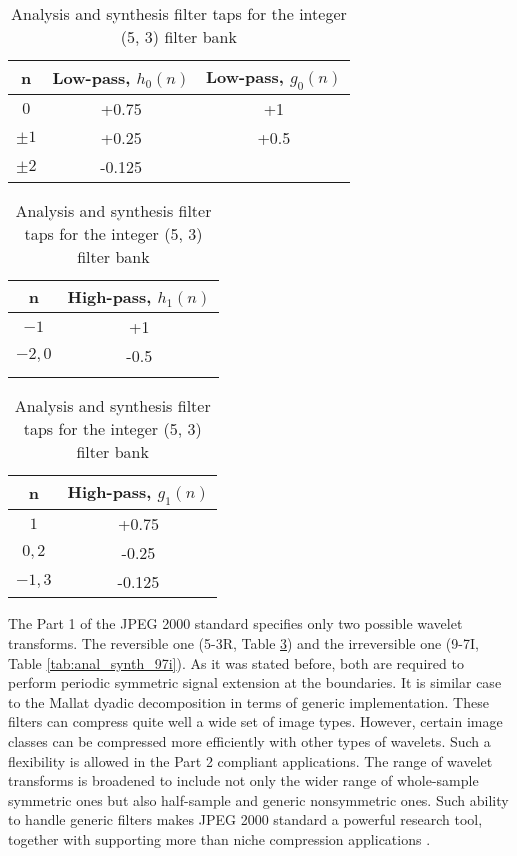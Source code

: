 \begin{table}
    \centering
    \caption{Analysis and synthesis filter taps for the integer (5, 3) filter bank}
    \label{tab:anal_synth_53r}
\begin{tabular}{ccc}
    \toprule
    n         & Low-pass, $h_{0}(n)$ & Low-pass, $g_{0}(n)$ \\
    \midrule
    $0$       & +0.75  & +1    \\
    $\pm 1$   & +0.25  & +0.5  \\
    $\pm 2$   & -0.125 &       \\
    \bottomrule
\end{tabular}

\bigskip
\bigskip


\begin{tabular}{cc}
    \toprule
    n         & High-pass, $h_{1}(n)$ \\
    \midrule
    $-1$      & +1   \\
    $-2, 0$   & -0.5 \\
              &      \\
    \bottomrule
\end{tabular}
\quad
\begin{tabular}{cc}
    \toprule
    n        & High-pass, $g_{1}(n)$ \\
    \midrule
    $1$      & +0.75  \\
    $0, 2$   & -0.25  \\
    $-1, 3$  & -0.125 \\
    \bottomrule
\end{tabular}
\end{table}

The Part 1 of the JPEG 2000 standard specifies only two possible wavelet transforms.
The reversible one (5-3R, Table \ref{tab:anal_synth_53r}) and the irreversible one
(9-7I, Table \ref{tab:anal_synth_97i}). As it was stated before, both
are required to perform periodic symmetric signal extension at the boundaries.
It is similar case to the Mallat dyadic decomposition in terms of generic implementation.
These filters can compress quite well a wide set of image types. However, certain image
classes can be compressed more efficiently with other types of wavelets. Such a flexibility
is allowed in the Part 2 compliant applications. The range of wavelet transforms is broadened
to include not only the wider range of whole-sample symmetric ones but also half-sample and
generic nonsymmetric ones. Such ability to handle generic filters makes JPEG 2000 standard
a powerful research tool, together with supporting more than niche compression applications \cite{jpeg_suite}.

